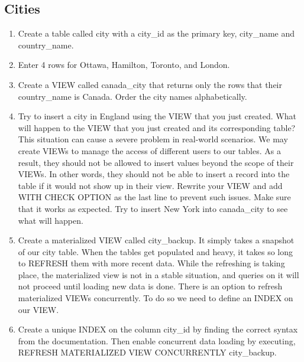 \documentclass{homework}
\begin{document}
\subsection*{Cities}
\begin{enumerate}
    \item Create a table called city with a city\_id as the primary key, city\_name and country\_name.
    \item Enter 4 rows for Ottawa, Hamilton, Toronto, and London.
    \item Create a VIEW called canada\_city that returns only the rows that their country\_name is Canada. Order the city names alphabetically.
    \item Try to insert a city in England using the VIEW that you just created. What will happen to the VIEW that you just created and its corresponding table? This situation can cause a severe problem in real-world scenarios. We may create VIEWs to manage the access of different users to our tables. As a result, they should not be allowed to insert values beyond the scope of their VIEWs. In other words, they should not be able to insert a record into the table if it would not show up in their view. Rewrite your VIEW and add WITH CHECK OPTION as the last line to prevent such issues. Make sure that it works as expected. Try to insert New York into canada\_city to see what will happen.

    \item Create a materialized VIEW called city\_backup. It simply takes a snapshot of our city table. When the tables get populated and heavy, it takes so long to REFRESH them with more recent data. While the refreshing is taking place, the materialized view is not in a stable situation, and queries on it will not proceed until loading new data is done. There is an option to refresh materialized VIEWs concurrently. To do so we need to define an INDEX on our VIEW. 

    \item Create a unique INDEX on the column city\_id by finding the correct syntax from the documentation. Then enable concurrent data loading by executing, REFRESH MATERIALIZED VIEW CONCURRENTLY city\_backup. 
\end{enumerate}
\end{document}
